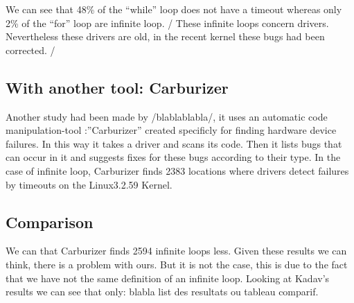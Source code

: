 \documentclass[a4paper,12pt]{article}
\begin{document}
We can see that 48\% of the ``while'' loop does not have a timeout whereas only 2\% of the ``for'' loop are infinite loop. / These infinite loops concern drivers. Nevertheless these drivers are old, in the recent kernel these bugs had been corrected. /

\subsection{With another tool: Carburizer}

Another study had been made by /blablablabla/, it uses an automatic code manipulation-tool :''Carburizer'' created specificly for finding hardware device failures. In this way it takes a driver and scans its code. Then it lists bugs that can occur in it and suggests fixes for these bugs according to their type. In the case of infinite loop, Carburizer finds 2383 locations where drivers detect failures by timeouts on the Linux3.2.59 Kernel.

\subsection{Comparison}
We can that Carburizer finds 2594 infinite loops less. Given these results we can think, there is a problem with ours. But it is not the case, this is due to the fact that we have not the same definition of an infinite loop. Looking at Kadav's results we can see that only: blabla list des resultats ou tableau comparif.

\end{document}
